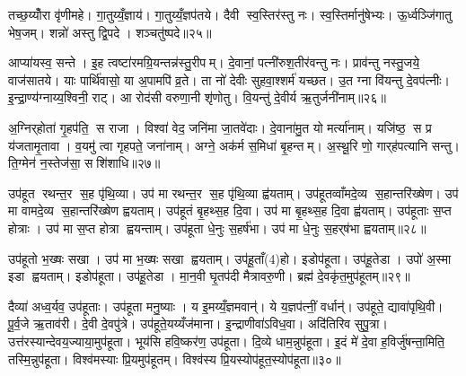 तच्छ॒य्योँरा वृ॑णीमहे। गा॒तुय्यँ॒ज्ञाय॑। गा॒तुय्यँ॒ज्ञप॑तये। दैवी स्व॒स्तिर॑स्तु नः। स्व॒स्तिर्मानु॑षेभ्यः। ऊ॒र्ध्वञ्जि॑गातु भेष॒जम्। शन्नो॑ अस्तु द्वि॒पदे। शञ्चतु॑ष्पदे॥२५॥\anuvakamend[तच्छ॒य्योँर॒ष्टौ]

आप्या॑यस्व॒ सन्ते। इ॒ह त्वष्टा॑रमग्रि॒यन्तन्न॑स्तु॒रीपम्। दे॒वानां॒ पत्नी॑रुश॒तीर॑वन्तु नः। प्राव॑न्तु नस्तु॒जये॒ वाज॑सातये। याः पार्थि॑वासो॒ या अ॒पामपि॑ व्र॒ते। ता नो॑ देवीः सुहवा॒श्शर्म॑ यच्छत। उ॒त ग्ना वि॑यन्तु दे॒वप॑त्नीः। इ॒न्द्रा॒ण्य॑ग्नाय्य॒श्विनी॒ राट्। आ रोद॑सी वरुणा॒नी शृ॑णोतु। वि॒यन्तु॑ दे॒वीर्य ऋ॒तुर्जनी॑नाम्॥२६॥

अ॒ग्निर्‌होता॑ गृ॒हप॑ति॒ स राजा। विश्वा॑ वेद॒ जनि॑मा जा॒तवे॑दाः। दे॒वाना॑मु॒त यो मर्त्या॑नाम्। यजि॑ष्ठ॒ स प्र य॑जतामृ॒तावा। व॒यमु॑ त्वा गृहपते॒ जना॑नाम्। अग्ने॒ अक॑र्म स॒मिधा॑ बृ॒हन्तम्। अ॒स्थू॒रि णो॒ गार्‌ह॑पत्यानि सन्तु। ति॒ग्मेन॑ न॒स्तेज॑सा॒ सशि॑शाधि॥२७॥\anuvakamend[जनी॑नाम॒ष्टौ च॑]

उप॑हूत रथन्त॒र स॒ह पृ॑थि॒व्या। उप॑ मा रथन्त॒र स॒ह पृ॑थि॒व्या ह्व॑यताम्। उप॑हूतव्वाँमदे॒व्य स॒हान्तरि॑ख्षेण। उप॑ मा वामदे॒व्य स॒हान्तरि॑ख्षेण ह्वयताम्। उप॑हूतं बृ॒हथ्स॒ह दि॒वा। उप॑ मा बृ॒हथ्स॒ह दि॒वा ह्व॑यताम्। उप॑हूताः स॒प्त होत्राः। उप॑ मा स॒प्त होत्रा ह्वयन्ताम्। उप॑हूता धे॒नुः स॒हर्ष॑भा। उप॑ मा धे॒नुः स॒हर्‌ष॑भा ह्वयताम्॥२८॥

उप॑हूतो भ॒ख्षः सखा। उप॑ मा भ॒ख्षः सखा ह्वयताम्। उप॑हू॒ताँ(4)हो। इडोप॑हूता। उप॑हू॒तेडा। उपो॑ अ॒स्मा इडा ह्वयताम्। इडोप॑हूता। उप॑हू॒तेडा। मा॒न॒वी घृ॒तप॑दी मैत्रावरु॒णी। ब्रह्म॑ दे॒वकृ॑त॒मुप॑हूतम्॥२९॥

दैव्या॑ अध्व॒र्यव॒ उप॑हूताः। उप॑हूता मनु॒ष्याः। य इ॒मय्यँ॒ज्ञमवान्॑। ये य॒ज्ञप॑त्नीं॒ वर्धान्॑। उप॑हूते॒ द्यावा॑पृथि॒वी। पू॒र्व॒जे ऋ॒ताव॑री। दे॒वी दे॒वपु॑त्रे। उप॑हूते॒यय्यँज॑माना। इ॒न्द्राणीवा॑ऽविध॒वा। अदि॑तिरिव सुपु॒त्रा। उत्त॑रस्यान्देवय॒ज्याया॒मुप॑हूता। भूय॑सि हवि॒ष्कर॑ण॒ उप॑हूता। दि॒व्ये धाम॒न्नुप॑हूता। इ॒दं मे॑ दे॒वा ह॒विर्जु॑षन्ता॒मिति॒ तस्मि॒न्नुप॑हूता। विश्व॑मस्याः प्रि॒यमुप॑हूतम्। विश्व॑स्य प्रि॒यस्योप॑हूत॒स्योप॑हूता॥३०॥



